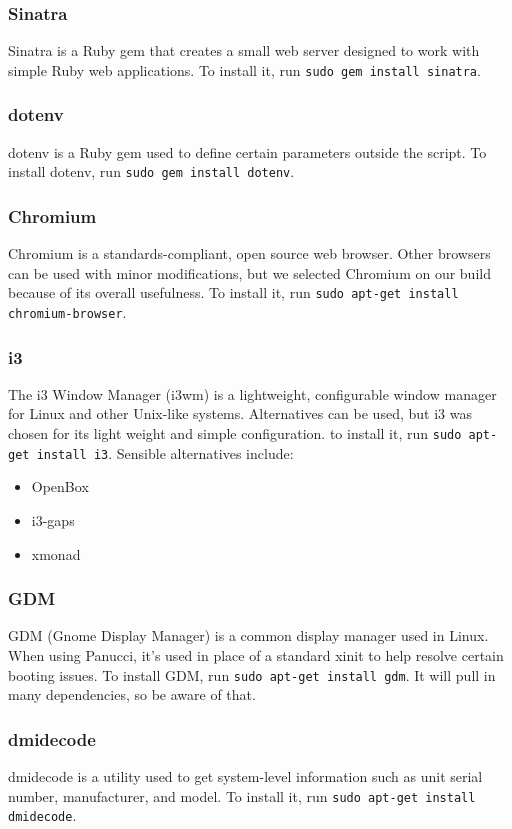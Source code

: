 \documentclass{article}
\def\code#1{\texttt{#1}}
\begin{document}
\begin{flushleft}
\subsubsection{Sinatra}
Sinatra is a Ruby gem that creates a small web server designed to work with simple Ruby web applications.  To install it, run \code{sudo gem install sinatra}.
\subsubsection{dotenv}
dotenv is a Ruby gem used to define certain parameters outside the script.  To install dotenv, run \code{sudo gem install dotenv}.
\subsubsection{Chromium}
Chromium is a standards-compliant, open source web browser.  Other browsers can be used with minor modifications, but we selected Chromium on our build because of its overall usefulness.  To install it, run \code{sudo apt-get install chromium-browser}.
\subsubsection{i3}
The i3 Window Manager (i3wm) is a lightweight, configurable window manager for Linux and other Unix-like systems.  Alternatives can be used, but i3 was chosen for its light weight and simple configuration.  to install it, run \code{sudo apt-get install i3}.\linebreak\linebreak
Sensible alternatives include:
\begin{itemize}
  \item OpenBox
  \item i3-gaps
  \item xmonad
\end{itemize}
\subsubsection{GDM}
GDM (Gnome Display Manager) is a common display manager used in Linux.  When using Panucci, it's used in place of a standard xinit to help resolve certain booting issues.  To install GDM, run \code{sudo apt-get install gdm}.  It will pull in many dependencies, so be aware of that.
\subsubsection{dmidecode}
dmidecode is a utility used to get system-level information such as unit serial number, manufacturer, and model.  To install it, run \code{sudo apt-get install dmidecode}.

\end{flushleft}
\end{document}

